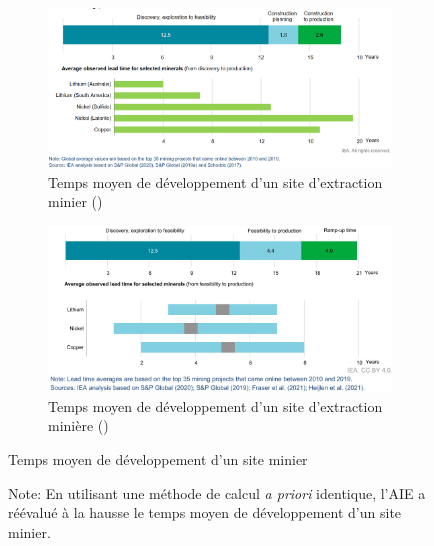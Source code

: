 \begin{figure}[!b]
\centering
\begin{subfigure}{0.8\textwidth}
    \includegraphics[width=\textwidth]{Images/supply_chain/Time_for_mining_2.jpg}
    \caption{Temps moyen de développement d'un site d'extraction minier (\cite{iea_role_2021})}
    \label{fig:Time_mining}
\end{subfigure}
\hfill
\begin{subfigure}{0.8\textwidth}
    \includegraphics[width=\textwidth]{Images/supply_chain/Time_for_mining.jpg}
    \caption{Temps moyen de développement d'un site d'extraction minière (\cite{iea_energy_2023})}
    \label{fig:Time_mining_2}
\end{subfigure}

\caption{Temps moyen de développement d'un site minier}
\caption*{Note: En utilisant une méthode de calcul \textit{a priori} identique, l'AIE a réévalué à la hausse le temps moyen de développement d'un site minier.}
\label{fig:Time_mining_all}
\end{figure}

